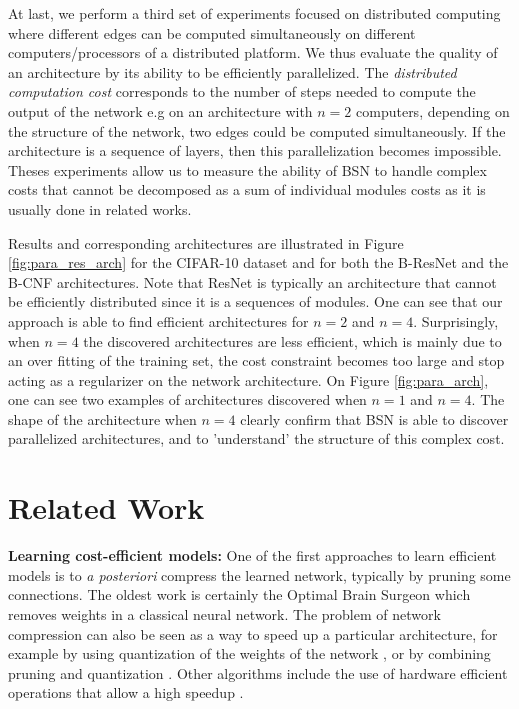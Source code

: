 \documentclass[10pt,twocolumn,letterpaper]{article}
\begin{document}
At last, we perform a third set of experiments focused on distributed computing where different edges can be computed simultaneously on different computers/processors of a distributed platform. We thus evaluate the quality of an architecture by its ability to be efficiently parallelized. The \textit{distributed computation cost} corresponds to the number of steps needed to compute the output of the network e.g on an architecture with $n=2$ computers, depending on the structure of the network, two edges could be computed simultaneously. If the architecture is a sequence of layers, then this parallelization becomes impossible. Theses experiments allow us to measure the ability of BSN to handle complex costs that cannot be decomposed as a sum of individual modules costs as it is usually done in related works. 

Results and corresponding architectures are illustrated in Figure \ref{fig:para_res_arch} for the CIFAR-10 dataset and for both the B-ResNet and the B-CNF architectures. Note that ResNet is typically an architecture that cannot be efficiently distributed since it is a sequences of modules. One can see that our approach is able to find efficient architectures for $n=2$ and $n=4$. Surprisingly, when $n=4$ the discovered architectures are less efficient, which is mainly due to an over fitting of the training set, the cost constraint becomes too large and stop acting as a regularizer on the network architecture. On Figure \ref{fig:para_arch}, one can see two examples of architectures discovered when $n=1$ and $n=4$. The shape of the architecture when $n=4$ clearly confirm that BSN is able to discover parallelized architectures, and to 'understand' the structure of this complex cost.  

\section{Related Work}\label{sec_related_work}

\textbf{Learning cost-efficient models: } One of the first approaches to learn efficient models is to \textit{a posteriori}  compress the learned network, typically by pruning some connections. The oldest work is certainly the Optimal Brain Surgeon \cite{Hassibi} which removes weights in a classical neural network. The problem of network compression can also be seen as a way to speed up a particular architecture, for example by using quantization of the weights of the network \cite{Vanhoucke11}, or by combining pruning and quantization  \cite{han}. Other algorithms include the use of hardware efficient operations that allow a high speedup \cite{hard}. 
\end{document}
